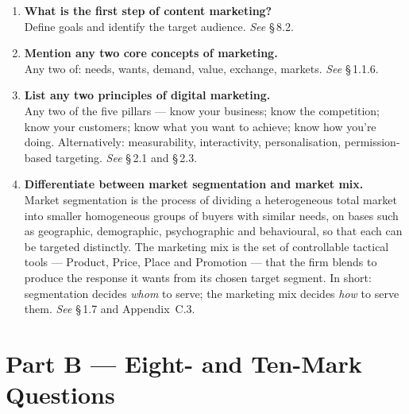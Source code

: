 \documentclass{MMTextbook}
\begin{document}
\begin{enumerate}[leftmargin=2.2em,itemsep=1.1ex]
\item \textbf{What is the first step of content marketing?}
      \\
      Define goals and identify the target audience. \hfill\emph{See} \S\,8.2.

\item \textbf{Mention any two core concepts of marketing.}
      \\
      Any two of: needs, wants, demand, value, exchange, markets.
      \hfill\emph{See} \S\,1.1.6.

\item \textbf{List any two principles of digital marketing.}
      \\
      Any two of the five pillars --- know your business; know the competition;
      know your customers; know what you want to achieve; know how you're doing.
      Alternatively: measurability, interactivity, personalisation,
      permission-based targeting. \hfill\emph{See} \S\,2.1 and \S\,2.3.

\item \textbf{Differentiate between market segmentation and market mix.}
      \\
      Market segmentation is the process of dividing a heterogeneous total
      market into smaller homogeneous groups of buyers with similar needs, on
      bases such as geographic, demographic, psychographic and behavioural, so
      that each can be targeted distinctly. The marketing mix is the set of
      controllable tactical tools --- Product, Price, Place and Promotion ---
      that the firm blends to produce the response it wants from its chosen
      target segment. In short: segmentation decides \emph{whom} to serve; the
      marketing mix decides \emph{how} to serve them.
      \hfill\emph{See} \S\,1.7 and Appendix~C.3.

\end{enumerate}

\section*{Part B --- Eight- and Ten-Mark Questions}
\end{document}
